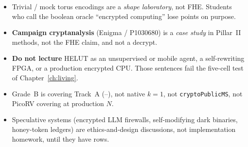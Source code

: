\begin{itemize}
  \item Trivial / mock torus encodings are a \emph{shape laboratory}, not FHE.
        Students who call the boolean oracle ``encrypted computing'' lose
        points on purpose.
  \item \textbf{Campaign cryptanalysis} (Enigma / P1030680) is a \emph{case study} in
        Pillar~II methods, not the FHE claim, and not a decrypt.
  \item \textbf{Do not lecture} HELUT as an unsupervised or mobile agent, a
        self-rewriting FPGA, or a production encrypted CPU. Those sentences fail
        the five-cell test of Chapter~\ref{ch:living}.
  \item {} Grade~B is covering Track~A (--), not native
        $k{=}1$, not \texttt{cryptoPublicMS}, not PicoRV covering at production
        $N$.
  \item Speculative systems (encrypted LLM firewalls, self-modifying dark
        binaries, honey-token ledgers) are ethics-and-design discussions,
        not implementation homework, until they have  rows.
\end{itemize}

